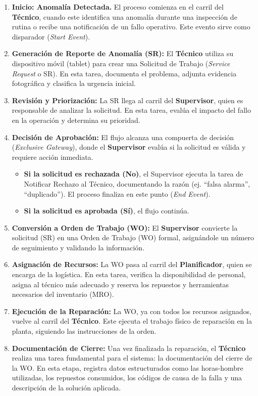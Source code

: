 \documentclass[12pt, a4paper]{article}
\begin{document}
\begin{enumerate}
    \item \textbf{Inicio: Anomalía Detectada.} El proceso comienza en el carril del \textbf{Técnico}, cuando este identifica una anomalía durante una inspección de rutina o recibe una notificación de un fallo operativo. Este evento sirve como disparador (\textit{Start Event}).
    \item \textbf{Generación de Reporte de Anomalía (SR):} El \textbf{Técnico} utiliza su dispositivo móvil (tablet) para crear una Solicitud de Trabajo (\textit{Service Request} o SR). En esta tarea, documenta el problema, adjunta evidencia fotográfica y clasifica la urgencia inicial.
    \item \textbf{Revisión y Priorización:} La SR llega al carril del \textbf{Supervisor}, quien es responsable de analizar la solicitud. En esta tarea, evalúa el impacto del fallo en la operación y determina su prioridad.
    \item \textbf{Decisión de Aprobación:} El flujo alcanza una compuerta de decisión (\textit{Exclusive Gateway}), donde el \textbf{Supervisor} evalúa si la solicitud es válida y requiere acción inmediata.
    \begin{itemize}
        \item \textbf{Si la solicitud es rechazada (No)}, el Supervisor ejecuta la tarea de Notificar Rechazo al Técnico, documentando la razón (ej. ``falsa alarma'', ``duplicado''). El proceso finaliza en este punto (\textit{End Event}).
        \item \textbf{Si la solicitud es aprobada (Sí)}, el flujo continúa.
    \end{itemize}
    \item \textbf{Conversión a Orden de Trabajo (WO):} El \textbf{Supervisor} convierte la solicitud (SR) en una Orden de Trabajo (WO) formal, asignándole un número de seguimiento y validando la información.
    \item \textbf{Asignación de Recursos:} La WO pasa al carril del \textbf{Planificador}, quien se encarga de la logística. En esta tarea, verifica la disponibilidad de personal, asigna al técnico más adecuado y reserva los repuestos y herramientas necesarios del inventario (MRO).
    \item \textbf{Ejecución de la Reparación:} La WO, ya con todos los recursos asignados, vuelve al carril del \textbf{Técnico}. Este ejecuta el trabajo físico de reparación en la planta, siguiendo las instrucciones de la orden.
    \item \textbf{Documentación de Cierre:} Una vez finalizada la reparación, el \textbf{Técnico} realiza una tarea fundamental para el sistema: la documentación del cierre de la WO. En esta etapa, registra datos estructurados como las horas-hombre utilizadas, los repuestos consumidos, los códigos de causa de la falla y una descripción de la solución aplicada.

\end{enumerate}
\end{document}

